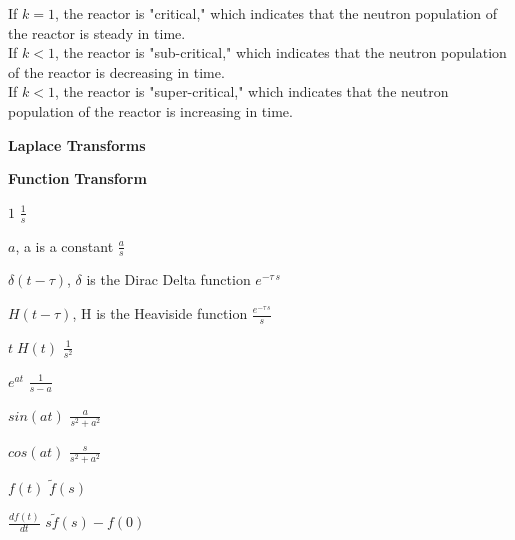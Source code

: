 \begin{flushleft}
\begin{questions}
{{\begin{solution}
If $k = 1$, the reactor is "critical," which indicates that the neutron population of the reactor is steady in time.\\
If $k < 1$, the reactor is "sub-critical," which indicates that the neutron population of the reactor is decreasing in time.\\
If $k < 1$, the reactor is "super-critical," which indicates that the neutron population of the reactor is increasing in time.\\ 

\end{solution}}}
\end{questions}\end{flushleft}
\pagebreak
\thispagestyle{head}
\begin{center}
\textbf{Laplace Transforms}
\end{center}


\textbf{Function} \hfill \textbf{Transform}

$1$ \hfill $\displaystyle\frac{1}{s}$

$a$, a is a constant \hfill $\displaystyle\frac{a}{s}$

$\delta(t-\tau)$, $\delta$ is the Dirac Delta function \hfill $e^{-\tau\, s}$

$H(t-\tau)$, H is the Heaviside function \hfill $\displaystyle\frac{e^{-\tau\,s}}{s}$

$t\;H(t)$ \hfill $\displaystyle\frac{1}{s^2}$

$e^{at}$ \hfill $\displaystyle\frac{1}{s-a}$

$sin(a t)$ \hfill $\displaystyle\frac{a}{s^2+a^2}$

$cos(a t)$ \hfill $\displaystyle\frac{s}{s^2+a^2}$

$f(t)$ \hfill $\tilde{f}(s)$

$\displaystyle\frac{df(t)}{dt}$ \hfill $s \tilde{f}(s) - f(0)$









